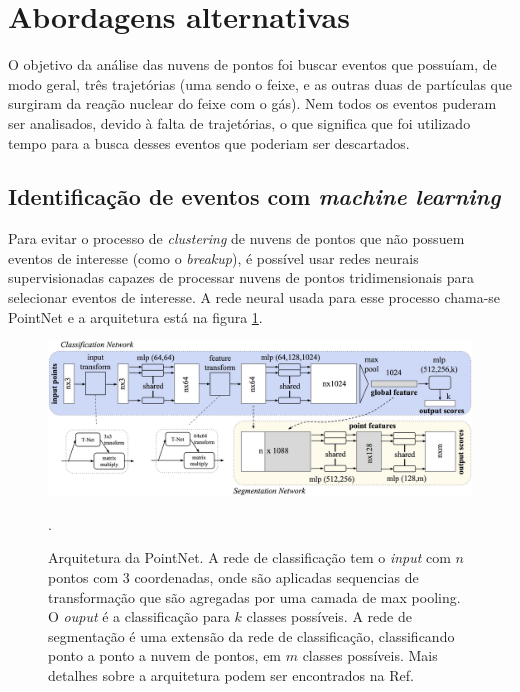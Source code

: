 \documentclass[a4paper,12pt,oneside]{book}
\begin{document}
\section{Abordagens alternativas}\label{sec:abordagens_alternativas}

\par  O objetivo da análise das nuvens de pontos foi buscar eventos que possuíam, de modo geral, três trajetórias (uma sendo o feixe, e as outras duas de partículas que surgiram da reação nuclear do feixe com o gás). Nem todos os eventos puderam ser analisados, devido à falta de trajetórias, o que significa que foi utilizado tempo para a busca desses eventos que poderiam ser descartados.

\subsection{Identificação de eventos com \textit{machine learning}}\label{subsec:pointnet}

\par Para evitar o processo de \textit{clustering} de nuvens de pontos que não possuem eventos de interesse (como o \textit{breakup}), é possível usar redes neurais supervisionadas capazes de processar nuvens de pontos tridimensionais para selecionar eventos de interesse. A rede neural usada para esse processo chama-se PointNet \cite{qi2016pointnet} e a arquitetura está na figura \ref{fig:aqr:pointnet}.

\begin{figure}[H]
    \centering
    \includegraphics[scale = 0.22]{figs/pointnet_arch.png}
    \caption{Arquitetura da PointNet. A rede de classificação tem o \textit{input} com $n$ pontos com 3 coordenadas, onde são aplicadas sequencias de transformação que são agregadas por uma camada de max pooling. O \textit{ouput} é a classificação para $k$ classes possíveis. A rede de segmentação é uma extensão da rede de classificação, classificando ponto a ponto a nuvem de pontos, em $m$ classes possíveis. Mais detalhes sobre a arquitetura podem ser encontrados na Ref. \cite{qi2016pointnet}}.
    \label{fig:aqr:pointnet}
\end{figure}
\end{document}
